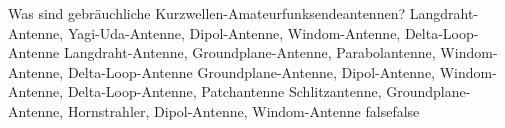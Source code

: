     {Was sind gebräuchliche Kurzwellen-Amateurfunksendeantennen?}
    {Langdraht-Antenne, Yagi-Uda-Antenne, Dipol-Antenne, Windom-Antenne, Delta-Loop-Antenne}
    {Langdraht-Antenne, Groundplane-Antenne, Parabolantenne, Windom-Antenne, Delta-Loop-Antenne}
    {Groundplane-Antenne, Dipol-Antenne, Windom-Antenne, Delta-Loop-Antenne, Patchantenne}
    {Schlitzantenne, Groundplane-Antenne, Hornstrahler, Dipol-Antenne, Windom-Antenne}
    {false}{false}